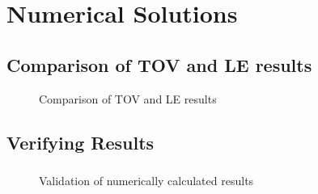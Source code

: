 \section{Numerical Solutions}

\subsection{Comparison of TOV and LE results}




\begin{frame}
	\begin{figure}
		\centering
		\caption{Comparison of TOV and LE results}
	\end{figure}
\end{frame}

\subsection{Verifying Results}
\begin{frame}
	\frametitle{\insertsubsection}
	\begin{figure}
		\centering
		\caption{Validation of numerically calculated results}
	\end{figure}
\end{frame}

